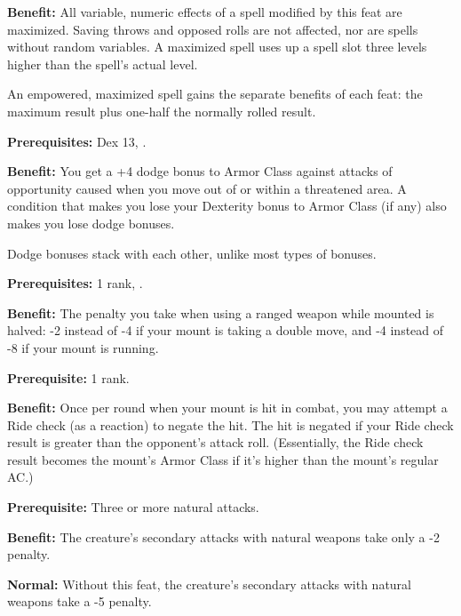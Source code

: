 
\textbf{Benefit:} All variable, numeric effects of a spell modified by this feat 
are maximized. Saving throws and opposed rolls are not affected, nor are spells 
without random variables. A maximized spell uses up a spell slot three levels higher 
than the spell's actual level.

An empowered, maximized spell gains the separate benefits of each feat: the maximum 
result plus one-half the normally rolled result.


\textbf{Prerequisites:} Dex 13, .

\textbf{Benefit:} You get a +4 dodge bonus to Armor Class against attacks of opportunity 
caused when you move out of or within a threatened area. A condition that makes 
you lose your Dexterity bonus to Armor Class (if any) also makes you lose dodge 
bonuses.

Dodge bonuses stack with each other, unlike most types of bonuses.


\textbf{Prerequisites:}  1 rank, .

\textbf{Benefit:} The penalty you take when using a ranged weapon while mounted 
is halved: -2 instead of -4 if your mount is taking a double move, and -4 instead 
of -8 if your mount is running.


\textbf{Prerequisite:}  1 rank.

\textbf{Benefit:} Once per round when your mount is hit in combat, you may attempt 
a Ride check (as a reaction) to negate the hit. The hit is negated if your Ride 
check result is greater than the opponent's attack roll. (Essentially, the Ride 
check result becomes the mount's Armor Class if it's higher than the mount's regular 
AC.)


\textbf{Prerequisite:} Three or more natural attacks.

\textbf{Benefit:} The creature's secondary attacks with natural weapons take only 
a -2 penalty.

\textbf{Normal:} Without this feat, the creature's secondary attacks with natural 
weapons take a -5 penalty.

